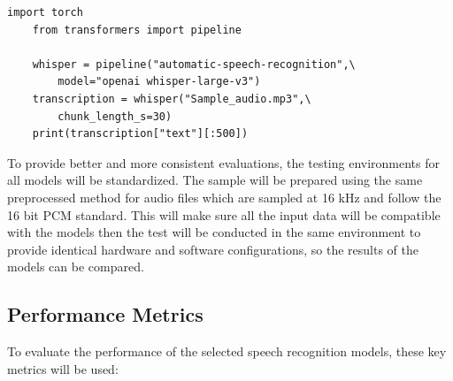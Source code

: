 \begin{lstlisting}[caption={Python code to load Whisper model from Hugging Face}]
    import torch
    from transformers import pipeline

    whisper = pipeline("automatic-speech-recognition",\
        model="openai whisper-large-v3")
    transcription = whisper("Sample_audio.mp3",\
        chunk_length_s=30)
    print(transcription["text"][:500])
\end{lstlisting}

To provide better and more consistent evaluations, the testing environments for all models will be standardized. The sample will be prepared using the same preprocessed method for audio files which are sampled at 16 kHz and follow the 16 bit PCM standard. This will make sure all the input data will be compatible with the models then the test will be conducted in the same environment to provide identical hardware and software configurations, so the results of the models can be compared. 


\subsection{Performance Metrics}
To evaluate the performance of the selected speech recognition models, these key metrics will be used:

